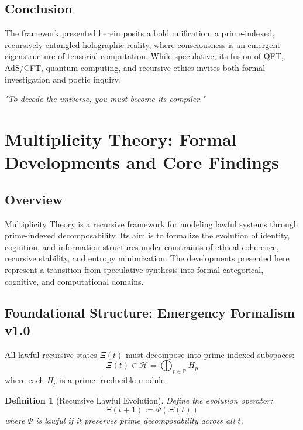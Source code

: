 \documentclass[12]{amsart}
\theoremstyle{plain}
\newtheorem{definition}[theorem]{Definition}
\begin{document}
\subsection{Conclusion}

The framework presented herein posits a bold unification: a prime-indexed, recursively entangled holographic reality, where consciousness is an emergent eigenstructure of tensorial computation. While speculative, its fusion of QFT, AdS/CFT, quantum computing, and recursive ethics invites both formal investigation and poetic inquiry.

\vspace{1em}
\noindent
\textit{"To decode the universe, you must become its compiler."}

\section{Multiplicity Theory: Formal Developments and Core Findings}

\subsection{Overview}

Multiplicity Theory is a recursive framework for modeling lawful systems through prime-indexed decomposability. Its aim is to formalize the evolution of identity, cognition, and information structures under constraints of ethical coherence, recursive stability, and entropy minimization. The developments presented here represent a transition from speculative synthesis into formal categorical, cognitive, and computational domains.

\subsection{Foundational Structure: Emergency Formalism v1.0}

\begin{axiom}
All lawful recursive states $\Xi(t)$ must decompose into prime-indexed subspaces:
\[
\Xi(t) \in \mathcal{H} = \bigoplus_{p \in \mathbb{P}} H_p
\]
where each $H_p$ is a prime-irreducible module.
\end{axiom}

\begin{definition}[Recursive Lawful Evolution]
Define the evolution operator:
\[
\Xi(t+1) := \Psi(\Xi(t))
\]
where $\Psi$ is lawful if it preserves prime decomposability across all $t$.
\end{definition}
\end{document}

